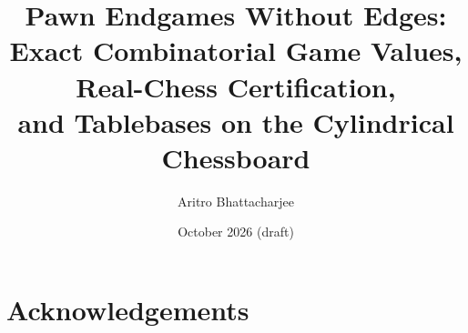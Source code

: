 \documentclass[11pt]{article}
\title{Pawn Endgames Without Edges:\\
Exact Combinatorial Game Values, Real-Chess Certification,\\
and Tablebases on the Cylindrical Chessboard}
\author{Aritro Bhattacharjee}
\date{October 2026 \quad (draft)}
\theoremstyle{plain}
\theoremstyle{definition}
\theoremstyle{remark}
\begin{document}
\maketitle

\begin{abstract}

\end{abstract}

\tableofcontents
\bigskip














\section*{Acknowledgements}





\appendix

\end{document}
